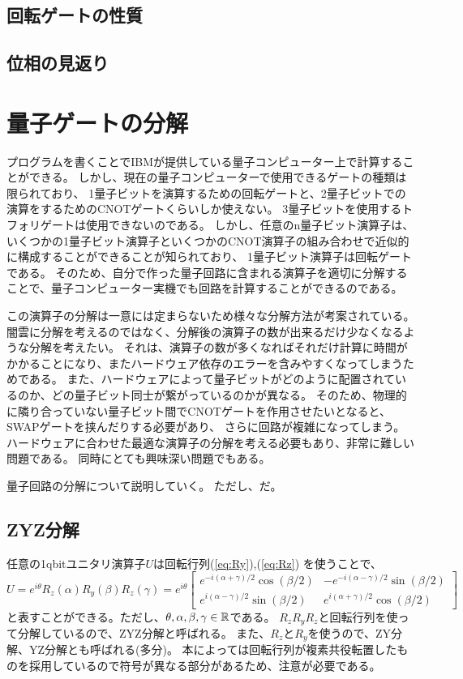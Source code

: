 \subsection{回転ゲートの性質}

\subsection{位相の見返り}




\section{量子ゲートの分解}
プログラムを書くことでIBMが提供している量子コンピューター上で計算することができる。
しかし、現在の量子コンピューターで使用できるゲートの種類は限られており、
1量子ビットを演算するための回転ゲートと、2量子ビットでの演算をするためのCNOTゲートくらいしか使えない。
3量子ビットを使用するトフォリゲートは使用できないのである。
しかし、任意のn量子ビット演算子は、いくつかの1量子ビット演算子といくつかのCNOT演算子の組み合わせで近似的に構成することができることが知られており、
1量子ビット演算子は回転ゲートである。
そのため、自分で作った量子回路に含まれる演算子を適切に分解することで、量子コンピューター実機でも回路を計算することができるのである。

この演算子の分解は一意には定まらないため様々な分解方法が考案されている。
闇雲に分解を考えるのではなく、分解後の演算子の数が出来るだけ少なくなるような分解を考えたい。
それは、演算子の数が多くなればそれだけ計算に時間がかかることになり、またハードウェア依存のエラーを含みやすくなってしまうためである。
また、ハードウェアによって量子ビットがどのように配置されているのか、どの量子ビット同士が繋がっているのかが異なる。
そのため、物理的に隣り合っていない量子ビット間でCNOTゲートを作用させたいとなると、SWAPゲートを挟んだりする必要があり、
さらに回路が複雑になってしまう。
ハードウェアに合わせた最適な演算子の分解を考える必要もあり、非常に難しい問題である。
同時にとても興味深い問題でもある。

量子回路の分解について説明していく。
ただし、だ。

\subsection{ZYZ分解} \label{sec:ZYZdecomposition}
任意の1qbitユニタリ演算子$U$は回転行列(\ref{eq:Ry}),(\ref{eq:Rz})
を使うことで、
\begin{equation}\label{eq:arbitaryU}
  U = e^{i\theta}R_z(\alpha)R_y(\beta)R_z(\gamma) =
  e^{i\theta}
  \begin{bmatrix}
    e^{-i(\alpha+\gamma)/2}\cos(\beta/2) & -e^{-i(\alpha-\gamma)/2}\sin(\beta/2)\\
    e^{i(\alpha-\gamma)/2}\sin(\beta/2)  & e^{i(\alpha+\gamma)/2}\cos(\beta/2)
\end{bmatrix}
\end{equation}
と表すことができる。ただし、$\theta,\alpha,\beta,\gamma\in\mathbb{R}$である。
$R_zR_yR_z$と回転行列を使って分解しているので、ZYZ分解と呼ばれる。
また、$R_z$と$R_y$を使うので、ZY分解、YZ分解とも呼ばれる(多分)。
本によっては回転行列が複素共役転置したものを採用しているので符号が異なる部分があるため、注意が必要である。

